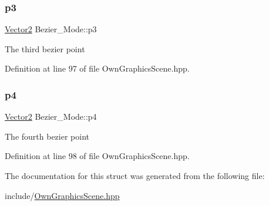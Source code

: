 \subsubsection{\texorpdfstring{p3}{p3}}
{\footnotesize\ttfamily \mbox{\hyperlink{classVector2}{Vector2}} Bezier\+\_\+\+Mode\+::p3}

The third bezier point 

Definition at line 97 of file Own\+Graphics\+Scene.\+hpp.

\mbox{\label{structBezier__Mode_a5a3df46137ba62eaf3f9c0ad1ee391ef}} 
\subsubsection{\texorpdfstring{p4}{p4}}
{\footnotesize\ttfamily \mbox{\hyperlink{classVector2}{Vector2}} Bezier\+\_\+\+Mode\+::p4}

The fourth bezier point 

Definition at line 98 of file Own\+Graphics\+Scene.\+hpp.



The documentation for this struct was generated from the following file\+:\begin{DoxyCompactItemize}
\item 
include/\mbox{\hyperlink{OwnGraphicsScene_8hpp}{Own\+Graphics\+Scene.\+hpp}}\end{DoxyCompactItemize}
